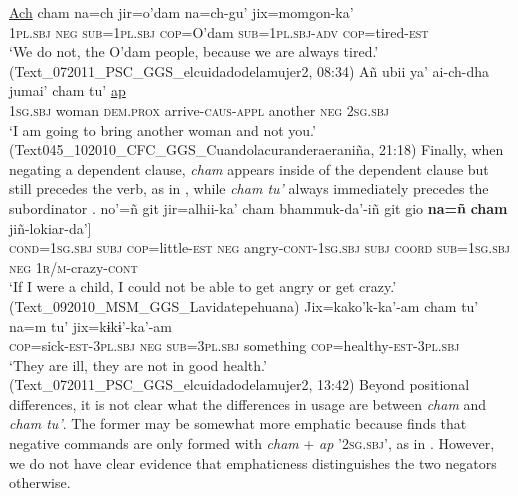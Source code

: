\documentclass[output=paper]{langsci/langscibook}
\begin{document}
\z 
\ea
\label{ex:odam-alwaystire}
\gll \underline{Ach} 		cham 	na=ch 			jir=o’dam 		na=ch-gu' 	jix=momgon-ka’\\
\textsc{1pl.sbj} 	\textsc{neg} 	\textsc{sub=1pl.sbj} 	\textsc{cop}=O'dam 	\textsc{sub=1pl.sbj-adv}	\textsc{cop}=tired-\textsc{est}\\
\glt ‘We do not, the O’dam people, because we are always tired.’ (Text\_072011\_PSC\_GGS\_elcuidadodelamujer2, 08:34)
\z 
\ea
\label{ex:odam-anotherwom}
\gll Añ      		ubii  		ya'	ai-ch-dha jumai' 		{cham tu'}       \underline{ap}\\
\textsc{1sg.sbj} 	woman		\textsc{dem.prox} 	arrive-\textsc{caus-appl}	another		\textsc{neg} \textsc{2sg.sbj}\\
\glt ‘I am going to bring another woman and not you.’
(Text045\_102010\_CFC\_GGS\_Cuandolacuranderaeraniña, 21:18)
\z 
Finally, when negating a dependent clause, \emph{cham} appears inside of the dependent clause but still precedes the verb, as in , while \emph{cham tu'} always immediately precedes the subordinator .
\ea
\label{ex:odam-chamdep}
\gll no’=ñ git jir=alhii-ka’ cham bhammuk-da’-iñ git gio {\ob}\textbf{na=ñ} \textbf{cham} jiñ-lokiar-da’]\\
\textsc{cond=1sg.sbj} \textsc{subj} \textsc{cop}=little-\textsc{est} \textsc{neg} angry-\textsc{cont-1sg.sbj} \textsc{subj} \textsc{coord} \textsc{sub=1sg.sbj} \textsc{neg} \textsc{1r/m}-crazy-\textsc{cont}\\
\glt `If I were a child, I could not be able to get angry or get crazy.'
(Text\_092010\_MSM\_GGS\_Lavidatepehuana)
\z
\ea
\label{ex:odam-chamtudep}
\gll Jix=kako’k-ka’-am {cham tu’} na=m tu’ jix=kɨkɨ’-ka’-am\\
\textsc{cop}=sick-\textsc{est-3pl.sbj} \textsc{neg} \textsc{sub=3pl.sbj} something \textsc{cop}=healthy-\textsc{est-3pl.sbj}\\
\glt ‘They are ill, they are not in good health.’
(Text\_072011\_PSC\_GGS\_elcuidadodelamujer2, 13:42)
\z
Beyond positional differences, it is not clear what the differences in usage are between \emph{cham} and \emph{cham tu'}. The former may be somewhat more emphatic because \citet[136-140]{garcia2014} finds that negative commands are only formed with \emph{cham} + \emph{ap} '\textsc{2sg.sbj}', as in . However, we do not have clear evidence that emphaticness distinguishes the two negators otherwise.
\ea
\label{ex:odam-negcomm}
\end{document}
